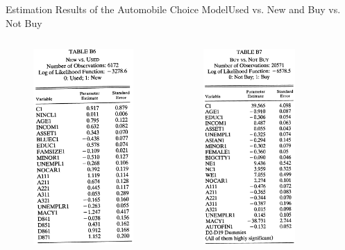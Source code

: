 \documentclass{beamer}
\begin{document}
\begin{frame}{Estimation Results of the Automobile Choice Model}{Used vs. New and Buy vs. Not Buy}
	\begin{columns}
		\begin{figure}[h]
			\centering
			\includegraphics[width=3.8cm]{table_b6.png}
		\end{figure}
		\begin{figure}[h]
			\centering
			\includegraphics[width=3.5cm]{table_b7.png}
		\end{figure}
	\end{columns}
\end{frame}
\end{document}
